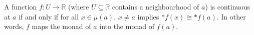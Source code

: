 A function $f: U \to \mathbb{R}$ (where $U \subseteq \mathbb{R}$ contains a neighbourhood of $a$) is continuous at $a$ if and only if for all $x \in \mu(a)$, $x \neq a$ implies $*f(x) \cong *f(a)$. In other words, $f$ maps the monad of $a$ into the monad of $f(a)$.
